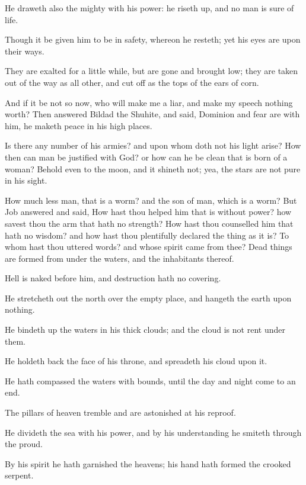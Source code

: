 \Verse He draweth also the mighty with his power: he riseth up, and no man is sure of life.

\Verse Though it be given him to be in safety, whereon he resteth; yet his eyes are upon their ways.

\Verse They are exalted for a little while, but are gone and brought low; they are taken out of the way as all other, and cut off as the tops of the ears of corn.

\Verse And if it be not so now, who will make me a liar, and make my speech nothing worth?  
\Chapter
\Verse Then answered Bildad the Shuhite, and said, \Verse Dominion and fear are with him, he maketh peace in his high places.

\Verse Is there any number of his armies? and upon whom doth not his light arise?  \Verse How then can man be justified with God? or how can he be clean that is born of a woman?  \Verse Behold even to the moon, and it shineth not; yea, the stars are not pure in his sight.

\Verse How much less man, that is a worm? and the son of man, which is a worm?  
\Chapter
\Verse But Job answered and said, \Verse How hast thou helped him that is without power? how savest thou the arm that hath no strength?  \Verse How hast thou counselled him that hath no wisdom? and how hast thou plentifully declared the thing as it is?  \Verse To whom hast thou uttered words? and whose spirit came from thee?  \Verse Dead things are formed from under the waters, and the inhabitants thereof.

\Verse Hell is naked before him, and destruction hath no covering.

\Verse He stretcheth out the north over the empty place, and hangeth the earth upon nothing.

\Verse He bindeth up the waters in his thick clouds; and the cloud is not rent under them.

\Verse He holdeth back the face of his throne, and spreadeth his cloud upon it.

\Verse He hath compassed the waters with bounds, until the day and night come to an end.

\Verse The pillars of heaven tremble and are astonished at his reproof.

\Verse He divideth the sea with his power, and by his understanding he smiteth through the proud.

\Verse By his spirit he hath garnished the heavens; his hand hath formed the crooked serpent.

